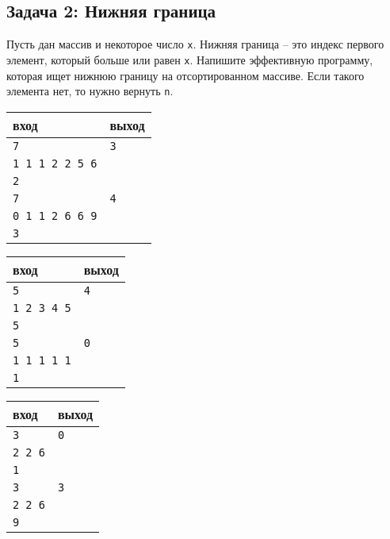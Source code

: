 \documentclass{article}
\begin{document}
\subsection*{Задача 2: Нижняя граница}
Пусть дан массив и некоторое число \texttt{x}. Нижняя граница -- это индекс первого элемент, который больше или равен \texttt{x}. Напишите эффективную программу, которая ищет нижнюю границу на отсортированном массиве. Если такого элемента нет, то нужно вернуть \texttt{n}.

\begin{multicols}{3}
\begin{center}
\begin{tabular}{ l | l }
 вход & выход \\ \hline
 \texttt{7} & \texttt{3}  \\  
 \texttt{1 1 1 2 2 5 6} & \\
 \texttt{2} & \\ \hline
 \texttt{7} & \texttt{4}  \\  
 \texttt{0 1 1 2 6 6 9} & \\
 \texttt{3} & \\ 
\end{tabular}
\end{center}

\begin{center}
\begin{tabular}{ l | l }
 вход & выход \\ \hline
 \texttt{5} & \texttt{4}  \\  
 \texttt{1 2 3 4 5} & \\
 \texttt{5} & \\ \hline
 \texttt{5} & \texttt{0}  \\  
 \texttt{1 1 1 1 1} & \\
 \texttt{1} & \\
\end{tabular}
\end{center}

\begin{center}
\begin{tabular}{ l | l }
 вход & выход \\ \hline
 \texttt{3} & \texttt{0}  \\  
 \texttt{2 2 6} & \\
 \texttt{1} & \\ \hline
 \texttt{3} & \texttt{3}  \\  
 \texttt{2 2 6} & \\
 \texttt{9} & \\
\end{tabular}
\end{center}
\end{multicols}
\end{document}
